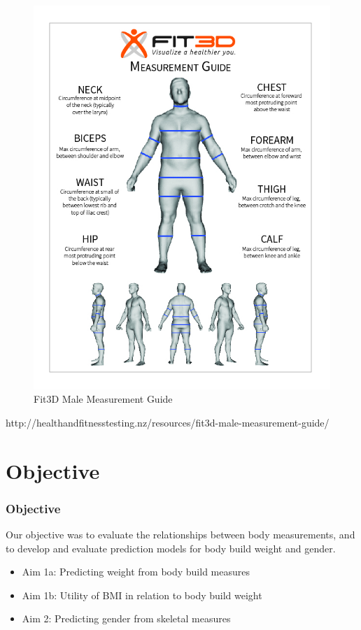 \documentclass{beamer}
\begin{document}
\begin{frame}

\begin{figure}
	\includegraphics[scale=0.25]{Girth.jpg}
	\caption{Fit3D Male Measurement Guide}
	\label{fig:girth}
\end{figure}

\small{http://healthandfitnesstesting.nz/resources/fit3d-male-measurement-guide/}
 
\end{frame}


\section{Objective}
\begin{frame}
\frametitle{Objective}
Our objective was to evaluate the relationships between body measurements, and to develop and evaluate prediction models for body build weight and gender.

\begin{itemize}
	\item Aim 1a: Predicting weight from body build measures
	\item Aim 1b: Utility of BMI in relation to body build weight
	\item Aim 2: Predicting gender from skeletal measures
\end{itemize}

\end{frame}
\end{document}
